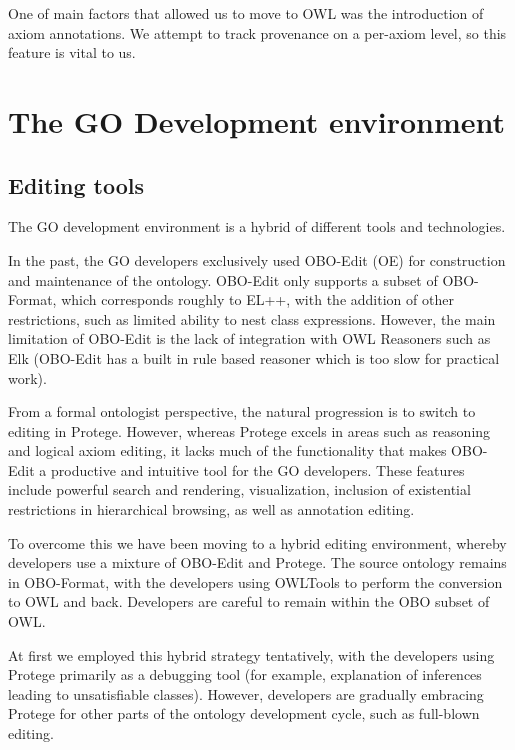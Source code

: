 \documentclass{llncs}
\begin{document}
One of main factors that allowed us to move to OWL was the
introduction of axiom annotations. We attempt to track provenance on a
per-axiom level, so this feature is vital to us.

\section{The GO Development environment}

\subsection{Editing tools}

The GO development environment is a hybrid of different tools and
technologies.

In the past, the GO developers exclusively used
OBO-Edit (OE)\cite{Day-Richter2007} for construction and maintenance of the
ontology. OBO-Edit only supports a subset of OBO-Format, which
corresponds roughly to EL++, with the addition of other restrictions,
such as limited ability to nest class expressions. However, the main
limitation of OBO-Edit is the lack of integration with OWL Reasoners
such as Elk (OBO-Edit has a built in rule based reasoner which is too
slow for practical work).

From a formal ontologist perspective, the natural progression is to
switch to editing in Protege. However, whereas Protege excels in areas
such as reasoning and logical axiom editing, it lacks much of the
functionality that makes OBO-Edit a productive and intuitive tool for
the GO developers. These features include powerful search and
rendering, visualization, inclusion of existential restrictions in
hierarchical browsing, as well as annotation editing. %

To overcome this we have been moving to a hybrid editing environment,
whereby developers use a mixture of OBO-Edit and Protege. The source
ontology remains in OBO-Format, with the developers using %
OWLTools\cite{OWLTools} to perform the conversion to OWL and
back. Developers are careful to remain within the OBO subset of OWL. %

At first we employed this hybrid strategy tentatively, with the
developers using Protege primarily as a debugging tool (for example,
explanation of inferences leading to unsatisfiable classes). However,
developers are gradually embracing Protege for other parts of the
ontology development cycle, such as full-blown editing.
\end{document}
